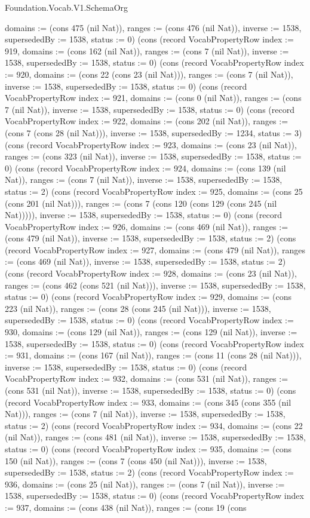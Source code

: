 \begin{lexlean}{Foundation.Vocab.V1.SchemaOrg}
\begin{semanticmodule}
{domains := (cons 475 (nil Nat)), ranges := (cons 476 (nil Nat)), inverse := 1538, supersededBy := 1538, status := 0}) (cons (record VocabPropertyRow {index := 919, domains := (cons 162 (nil Nat)), ranges := (cons 7 (nil Nat)), inverse := 1538, supersededBy := 1538, status := 0}) (cons (record VocabPropertyRow {index := 920, domains := (cons 22 (cons 23 (nil Nat))), ranges := (cons 7 (nil Nat)), inverse := 1538, supersededBy := 1538, status := 0}) (cons (record VocabPropertyRow {index := 921, domains := (cons 0 (nil Nat)), ranges := (cons 7 (nil Nat)), inverse := 1538, supersededBy := 1538, status := 0}) (cons (record VocabPropertyRow {index := 922, domains := (cons 202 (nil Nat)), ranges := (cons 7 (cons 28 (nil Nat))), inverse := 1538, supersededBy := 1234, status := 3}) (cons (record VocabPropertyRow {index := 923, domains := (cons 23 (nil Nat)), ranges := (cons 323 (nil Nat)), inverse := 1538, supersededBy := 1538, status := 0}) (cons (record VocabPropertyRow {index := 924, domains := (cons 139 (nil Nat)), ranges := (cons 7 (nil Nat)), inverse := 1538, supersededBy := 1538, status := 2}) (cons (record VocabPropertyRow {index := 925, domains := (cons 25 (cons 201 (nil Nat))), ranges := (cons 7 (cons 120 (cons 129 (cons 245 (nil Nat))))), inverse := 1538, supersededBy := 1538, status := 0}) (cons (record VocabPropertyRow {index := 926, domains := (cons 469 (nil Nat)), ranges := (cons 479 (nil Nat)), inverse := 1538, supersededBy := 1538, status := 2}) (cons (record VocabPropertyRow {index := 927, domains := (cons 479 (nil Nat)), ranges := (cons 469 (nil Nat)), inverse := 1538, supersededBy := 1538, status := 2}) (cons (record VocabPropertyRow {index := 928, domains := (cons 23 (nil Nat)), ranges := (cons 462 (cons 521 (nil Nat))), inverse := 1538, supersededBy := 1538, status := 0}) (cons (record VocabPropertyRow {index := 929, domains := (cons 223 (nil Nat)), ranges := (cons 28 (cons 245 (nil Nat))), inverse := 1538, supersededBy := 1538, status := 0}) (cons (record VocabPropertyRow {index := 930, domains := (cons 129 (nil Nat)), ranges := (cons 129 (nil Nat)), inverse := 1538, supersededBy := 1538, status := 0}) (cons (record VocabPropertyRow {index := 931, domains := (cons 167 (nil Nat)), ranges := (cons 11 (cons 28 (nil Nat))), inverse := 1538, supersededBy := 1538, status := 0}) (cons (record VocabPropertyRow {index := 932, domains := (cons 531 (nil Nat)), ranges := (cons 531 (nil Nat)), inverse := 1538, supersededBy := 1538, status := 0}) (cons (record VocabPropertyRow {index := 933, domains := (cons 345 (cons 355 (nil Nat))), ranges := (cons 7 (nil Nat)), inverse := 1538, supersededBy := 1538, status := 2}) (cons (record VocabPropertyRow {index := 934, domains := (cons 22 (nil Nat)), ranges := (cons 481 (nil Nat)), inverse := 1538, supersededBy := 1538, status := 0}) (cons (record VocabPropertyRow {index := 935, domains := (cons 150 (nil Nat)), ranges := (cons 7 (cons 450 (nil Nat))), inverse := 1538, supersededBy := 1538, status := 2}) (cons (record VocabPropertyRow {index := 936, domains := (cons 25 (nil Nat)), ranges := (cons 7 (nil Nat)), inverse := 1538, supersededBy := 1538, status := 0}) (cons (record VocabPropertyRow {index := 937, domains := (cons 438 (nil Nat)), ranges := (cons 19 (cons }
\end{semanticmodule}
\end{lexlean}
